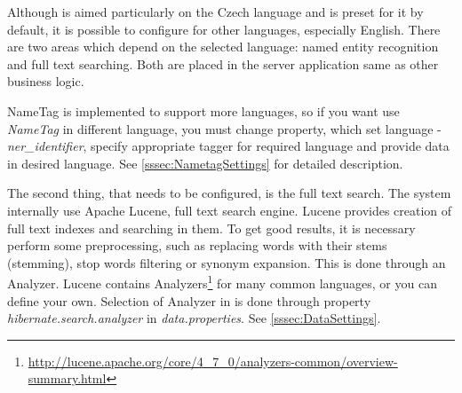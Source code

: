 
Although \textan{} is aimed particularly on the Czech language and is preset for
it by default, it is possible to configure \textan{} for other languages, especially
English. There are two areas which depend on the selected language: named entity
recognition and full text searching. Both are placed in the server application
same as other business logic.

NameTag is implemented to support more languages, so if you want use {\it NameTag} in different language, you must change property, which set language  - {\it ner\_identifier},
specify appropriate tagger for required language and provide data in desired language.
See \ref{sssec:NametagSettings} for detailed description.

The second thing, that needs to be configured, is the full text search. The system
internally use Apache Lucene, full text search engine. Lucene provides creation
of full text indexes and searching in them. To get good results, it is necessary
perform some preprocessing, such as replacing words with their stems (stemming),
stop words filtering or synonym expansion. This is done through an Analyzer. Lucene
contains Analyzers\footnote{\url{http://lucene.apache.org/core/4_7_0/analyzers-common/overview-summary.html}}
for many common languages, or you can define your own. Selection of Analyzer in 
\textan{} is done through property \emph{hibernate.search.analyzer} in \emph{data.properties}.
See \ref{sssec:DataSettings}.

